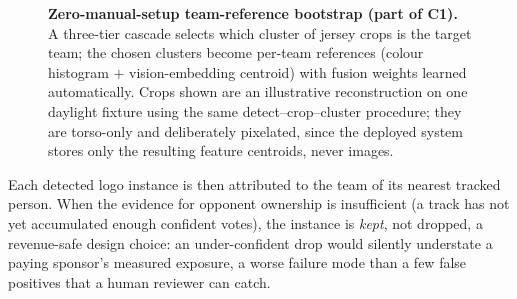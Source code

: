 \documentclass[conference,a4paper]{IEEEtran}
\begin{document}
\begin{figure}[!t]
\centering

\caption{\textbf{Zero-manual-setup team-reference bootstrap (part of C1).} A three-tier
cascade selects which cluster of jersey crops is the target team; the chosen
clusters become per-team references (colour histogram $+$ vision-embedding
centroid) with fusion weights learned automatically. Crops shown are an
illustrative reconstruction on one daylight fixture using the same
detect--crop--cluster procedure; they are torso-only and deliberately pixelated,
since the deployed system stores only the resulting feature centroids, never
images.}
\label{fig:teamref}
\end{figure}
Each detected logo instance is then attributed to the team of its nearest tracked
person. When the evidence for opponent ownership is insufficient (a track has not yet
accumulated enough confident votes), the instance is \emph{kept}, not dropped,
a revenue-safe design choice: an under-confident drop would silently
understate a paying sponsor's measured exposure, a worse failure mode
than a few false positives that a human reviewer can catch.
\end{document}
